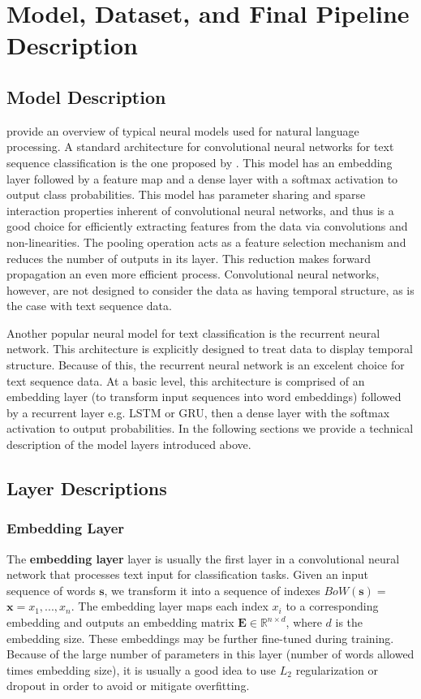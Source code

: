 
\chapter{Model, Dataset, and Final Pipeline Description}
\section{Model Description}
\cite{yin2017comparative} provide an overview of typical neural models used for natural language processing.
A standard architecture for convolutional neural networks for text sequence classification is the one proposed by
\cite{kim2014convolutional}. This model has an embedding layer followed by a feature map and a dense layer with a softmax activation
to output class probabilities. This model has parameter sharing and sparse interaction properties inherent of convolutional
neural networks, and thus is a good choice for efficiently extracting features from the data via convolutions and non-linearities.
The pooling operation acts as a feature selection mechanism and reduces the number of outputs in its layer. This reduction makes forward propagation
an even more efficient process. Convolutional neural networks, however, are not designed to consider the data as having temporal
structure, as is the case with text sequence data.

Another popular neural model for text classification is the recurrent neural network. This architecture is explicitly designed to treat
data to display temporal structure. Because of this, the recurrent neural network is an excelent choice for text sequence data.
At a basic level, this architecture is comprised of an embedding layer (to transform input sequences into word embeddings)
followed by a recurrent layer e.g. LSTM or GRU, then a dense layer with the softmax activation to output probabilities.
In the following sections we provide a technical description of the model layers introduced above.

\section{Layer Descriptions}
\subsection{Embedding Layer}\label{embeddinglayer}
The \textbf{embedding layer} layer is usually the first layer in a convolutional neural network that processes text input for classification tasks.
Given an input sequence of words $\bm{s}$, we transform it into a sequence of indexes $BoW(\bm{s})=$ $\bm{x} = x_1,...,x_n$.
The embedding layer maps each index $x_i$ to a corresponding embedding and outputs an embedding matrix $\mathbf{E} \in \mathbb{R}^{n \times d}$, where $d$ is
the embedding size. These embeddings may be further fine-tuned during training. Because of the large number of
parameters in this layer (number of words allowed times embedding size), it is usually a good idea to
use $L_2$ regularization or dropout in order to avoid or mitigate overfitting.

